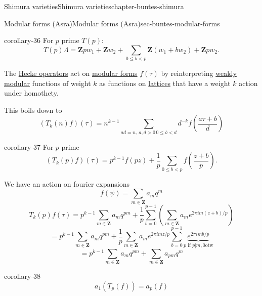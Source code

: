 \documentclass[oneside,10pt,]{book}
\numberwithin{equation}{section}
\newcommand{\ZZ}{\mathbf{Z}}
\newcommand{\lt}{<}
\newcommand{\gt}{>}
\begin{document}
\begin{chapterptx}{Shimura varieties}{}{Shimura varieties}{}{}{chapter-buntes-shimura}
\begin{sectionptx}{Modular forms (Asra)}{}{Modular forms (Asra)}{}{}{sec-buntes-modular-forms}
\begin{corollary}{}{}{corollary-36}%
\hypertarget{p-1079}{}%
For \(p \) prime \(T(p)\):%
\begin{equation*}
T(p) \Lambda = \ZZ pw_1 + \ZZ w_2 +\sum_{0 \le b \lt p} \ZZ(w_1 + bw_2) + \ZZ pw_2\text{.}
\end{equation*}
%
\end{corollary}
\hypertarget{p-1080}{}%
The \hyperref[def-buntes-hecke-ops]{Hecke operators} act on \hyperref[def-buntes-mfs]{modular forms} \(f(\tau)\) by reinterpreting \hyperref[def-buntes-weak-modular]{weakly modular} functions of weight \(k\) as functions on \hyperref[def-buntes-lattice]{lattices} that have  a weight \(k\) action under homothety.%
\par
\hypertarget{p-1081}{}%
This boils down to%
\begin{equation*}
(T_k(n) f)(\tau) = n^{k-1}  \sum_{ ad= n,\, a,d\gt 0\, 0\le b \lt d} d^{-k} f\left( \frac{ a\tau +b}{d}\right)
\end{equation*}
%
\begin{corollary}{}{}{corollary-37}%
\hypertarget{p-1082}{}%
For \(p \) prime%
\begin{equation*}
(T_k(p) f)(\tau) = p^{k-1}f(pz) +\frac 1p \sum_{0 \le b  \lt p} f\left( \frac {z + b}{p} \right)\text{.}
\end{equation*}
%
\end{corollary}
\hypertarget{p-1083}{}%
We have an action on fourier expansions%
\begin{equation*}
f(\psi) = \sum_{m\in \ZZ} a_m q^m
\end{equation*}
%
\begin{equation*}
T_k(p)f(\tau) = p^{k-1} \sum_{m\in \ZZ} a_m q^{pm} + \frac{1}{p} \sum_{b=0}^{p-1}  \left( \sum_{m\in \ZZ} a_m e^{2\pi i m (z+b)/p}\right)
\end{equation*}
%
\begin{equation*}
= p^{k-1} \sum_{m\in \ZZ} a_m q^{pm} + \frac{1}{p}  \sum_{m\in \ZZ} a_me^{2\pi i m z/p} \sum_{b=0}^{p-1} \underbrace{e^{2\pi i m b/p}}_{p\text{ if }p|m,0\text{otw}}
\end{equation*}
%
\begin{equation*}
= p^{k-1} \sum_{m\in \ZZ} a_m q^{pm} +\sum_{m\in \ZZ} a_{pm}q^m
\end{equation*}
%
\begin{corollary}{}{}{corollary-38}%
\hypertarget{p-1084}{}%
%
\begin{equation*}
a_1(T_p(f)) = a_p(f)
\end{equation*}

\end{corollary}
\end{sectionptx}
\end{chapterptx}
\end{document}
